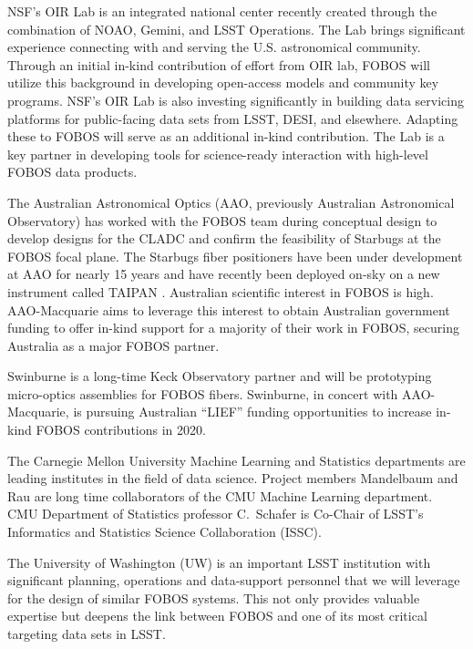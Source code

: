 \documentclass[oneside,11pt]{amsart}
\begin{document}
  NSF’s OIR Lab is an integrated national center recently created through the
combination of NOAO, Gemini, and LSST Operations. The Lab brings significant experience connecting with and serving the
U.S. astronomical community. Through an initial in-kind contribution of effort from OIR lab, FOBOS will utilize this
background in developing open-access models and community key programs. NSF’s OIR Lab is also investing significantly
in building data servicing platforms for public-facing data sets from LSST, DESI, and elsewhere.  Adapting these to
FOBOS will serve as an additional in-kind contribution. The Lab is a key partner in developing tools for science-ready
interaction with high-level FOBOS data products.

 The Australian Astronomical Optics (AAO, previously Australian
Astronomical Observatory) has worked with the FOBOS team during conceptual design to develop designs for the CLADC and
confirm the feasibility of Starbugs at the FOBOS focal plane.  The Starbugs fiber positioners have been under
development at AAO for nearly 15 years and have recently been deployed on-sky on a new instrument called TAIPAN
\citep{staszak16}.  Australian scientific interest in FOBOS is high.  AAO-Macquarie aims to leverage this interest to obtain Australian government funding to offer in-kind support for a majority of their work in FOBOS, securing Australia as a major FOBOS partner.


 Swinburne is a long-time Keck Observatory partner and will be prototyping micro-optics assemblies for FOBOS fibers.  Swinburne, in concert with AAO-Macquarie, is pursuing Australian ``LIEF'' funding opportunities to increase in-kind FOBOS contributions in 2020.


 The Carnegie Mellon University Machine Learning and Statistics
departments are leading institutes in the field of data science.  Project members Mandelbaum and Rau are long time
collaborators of the CMU Machine Learning department.  CMU Department of Statistics professor C.~Schafer is Co-Chair of
LSST's Informatics and Statistics Science Collaboration (ISSC).


 The University of Washington (UW) is an important LSST institution with significant planning, operations and data-support personnel that we will leverage for the design of similar FOBOS systems.  This not only provides valuable expertise but deepens the link between FOBOS and one of its most critical targeting data sets in LSST.
\end{document}
